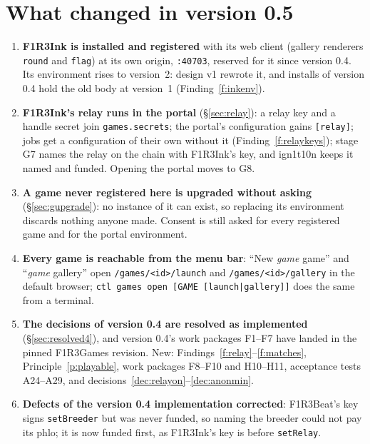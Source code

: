 \documentclass[11pt]{article}
\theoremstyle{definition}
\theoremstyle{remark}
\newcommand{\code}[1]{\texttt{#1}}
\newcommand{\Hr}{ign1t10n}
\newcommand{\Gm}{F1R3Games}
\begin{document}
\tableofcontents
\newpage

\section{What changed in version 0.5}\label{sec:changes5}

\begin{enumerate}[itemsep=2pt]
\item \textbf{F1R3Ink is installed and registered} with its web client (gallery
  renderers \code{round} and \code{flag}) at its own origin, \code{:40703}, reserved
  for it since version 0.4. Its environment rises to version~2: design v1 rewrote it,
  and installs of version 0.4 hold the old body at version~1
  (Finding~\ref{f:inkenv}).
\item \textbf{F1R3Ink's relay runs in the portal} (\S\ref{sec:relay}): a relay key
  and a handle secret join \code{games.secrets}; the portal's configuration gains
  \code{[relay]}; jobs get a configuration of their own without it
  (Finding~\ref{f:relaykeys}); stage G7 names the relay on the chain with F1R3Ink's
  key, and \Hr{} keeps it named and funded. Opening the portal moves to G8.
\item \textbf{A game never registered here is upgraded without asking}
  (\S\ref{sec:gupgrade}): no instance of it can exist, so replacing its environment
  discards nothing anyone made. Consent is still asked for every registered game and
  for the portal environment.
\item \textbf{Every game is reachable from the menu bar}: ``New \textit{game}
  game'' and ``\textit{game} gallery'' open \code{/games/<id>/launch} and
  \code{/games/<id>/gallery} in the default browser; \code{ctl games open
  [GAME [launch|gallery]]} does the same from a terminal.
\item \textbf{The decisions of version 0.4 are resolved as implemented}
  (\S\ref{sec:resolved4}), and version 0.4's work packages F1--F7 have landed in the
  pinned \Gm{} revision. New: Findings~\ref{f:relay}--\ref{f:matches},
  Principle~\ref{p:playable}, work packages F8--F10 and H10--H11, acceptance tests
  A24--A29, and decisions~\ref{dec:relayon}--\ref{dec:anonmin}.
\item \textbf{Defects of the version 0.4 implementation corrected}: F1R3Beat's key
  signs \code{setBreeder} but was never funded, so naming the breeder could not pay
  its phlo; it is now funded first, as F1R3Ink's key is before \code{setRelay}.
\end{enumerate}
\end{document}
